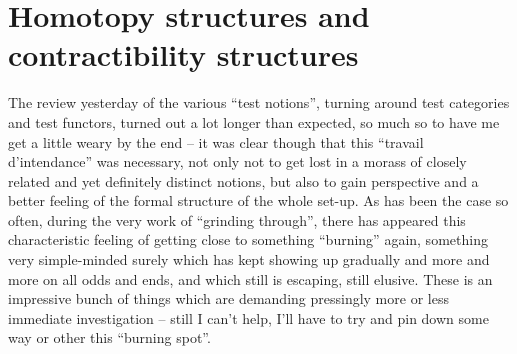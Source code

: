 













\chapter{Homotopy structures and contractibility structures}
\label{ch:III}

\presectionfill{}\par

%
\label{sec:45}%
The review yesterday of the various ``test notions'', turning around
test categories and test functors, turned out a lot longer than
expected, so much so to have me get a little weary by the end -- it
was clear though that this ``travail d'intendance'' was necessary, not
only not to get lost in a morass of closely related and yet definitely
distinct notions, but also to gain perspective and a better feeling of
the formal structure of the whole set-up. As has been the case so
often, during the very work of ``grinding through'', there has
appeared this characteristic feeling of getting close to something
``burning'' again, something very simple-minded surely which has kept
showing up gradually and more and more on all odds and ends, and which
still is escaping, still elusive. These is an impressive bunch of
things which are demanding pressingly more or less immediate
investigation -- still I can't help, I'll have to try and pin down
some way or other this ``burning spot''.

